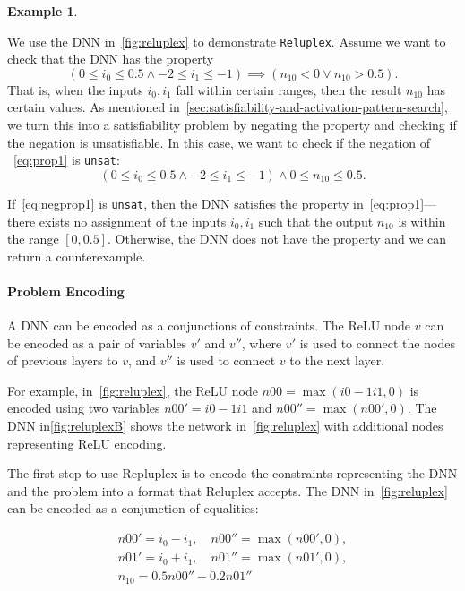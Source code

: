 \documentclass[oneside,11pt,dvipsnames]{book}
\numberwithin{equation}{section}
\theoremstyle{definition}
\newtheorem{example}{Example}[section]
\theoremstyle{remark}
\newcommand{\reluplex}{\texttt{Reluplex}}
\newcommand{\unsat}{\texttt{unsat}}
\begin{document}
  \begin{example}\label{ex:reluplex}

  We use the DNN in~\autoref{fig:reluplex} to demonstrate \reluplex{}. Assume we want to check that the DNN has the property
\begin{equation}\label{eq:prop1}
  (0 \le i_0 \le 0.5 \land -2 \le i_1 \le -1) \implies ( n_{10}< 0 \lor n_{10} > 0.5).
\end{equation}
That is, when the inputs $i_0, i_1$ fall within certain ranges, then the result $n_{10}$ has certain values.
As mentioned in~\ref{sec:satisfiability-and-activation-pattern-search}, we turn this into a satisfiability problem by negating the property and checking if the negation is unsatisfiable.
In this case, we want to check if the negation of ~\autoref{eq:prop1} is \unsat{}:
\begin{equation}\label{eq:negprop1}
    ( 0 \le i_0 \le 0.5 \land -2 \le i_1 \le -1) \land 0 \le n_{10} \le 0.5.
  \end{equation}

If~\autoref{eq:negprop1} is \unsat{}, then the DNN satisfies the property in~\autoref{eq:prop1}---there exists no assignment of the inputs $i_0, i_1$ such that the output $n_{10}$ is within the range $[0, 0.5]$. Otherwise, the DNN does not have the property and we can return a counterexample.


\paragraph{Problem Encoding}  A DNN can be encoded as a conjunctions of constraints.  The ReLU node $v$ can be encoded as a pair of variables $v'$ and $v''$, where $v'$ is used to connect the nodes of previous layers to $v$, and $v''$ is used to connect $v$ to the next layer.

For example, in~\autoref{fig:reluplex}, the ReLU node $n00=\max(i0 -1i1,0)$ is encoded using two variables $n00'=i0 -1i1$ and $n00''=\max(n00',0)$.  The DNN in\autoref{fig:reluplexB} shows the network in~\autoref{fig:reluplex} with additional nodes representing ReLU encoding.



The first step to use Repluplex is to encode the constraints representing the DNN and the problem into a format that Reluplex accepts.
The DNN in~\autoref{fig:reluplex} can be encoded as a conjunction of equalities:

\begin{gather*}%
    n00' = i_0 - i_1,\quad n00'' = \max(n00',0),\\
    n01' = i_0 + i_1, \quad n01'' = \max(n01',0),\\
    n_{10} = 0.5n00'' - 0.2n01''
\end{gather*}


\end{example}
\end{document}
